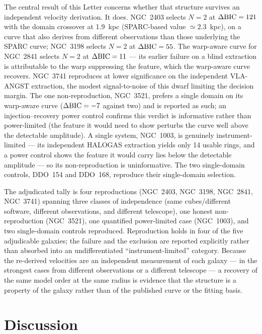 \documentclass[twocolumn]{aastex701}
\newcommand{\dbic}{\Delta{\rm BIC}}
\begin{document}
The central result of this Letter concerns whether that structure survives an
independent velocity derivation. It does. NGC~2403 selects $N = 2$ at $\dbic =
121$ with the domain crossover at 1.9~kpc (SPARC-based value $\simeq 2.3$~kpc),
on a curve that also derives from different observations than those underlying the
SPARC curve; NGC~3198 selects $N = 2$ at $\dbic = 55$. The warp-aware curve for
NGC~2841 selects $N = 2$ at $\dbic = 11$ --- its earlier failure on a blind
extraction is attributable to the warp suppressing the feature, which the
warp-aware curve recovers. NGC~3741 reproduces at lower significance on the
independent VLA-ANGST extraction, the modest signal-to-noise of this dwarf
limiting the decision margin. The one non-reproduction, NGC~3521, prefers a
single domain on its warp-aware curve ($\dbic = -7$ against two) and is reported
as such; an injection--recovery power control confirms this verdict is
informative rather than power-limited (the feature it would need to show perturbs
the curve well above the detectable amplitude). A single system, NGC~1003, is
genuinely instrument-limited --- its independent HALOGAS extraction yields only 14
usable rings, and a power control shows the feature it would carry lies below the
detectable amplitude --- so its non-reproduction is uninformative. The two
single-domain controls, DDO~154 and DDO~168, reproduce their single-domain
selection.

The adjudicated tally is four reproductions (NGC~2403, NGC~3198, NGC~2841,
NGC~3741) spanning three classes of independence (same cubes/different software,
different observations, and different telescope), one honest non-reproduction
(NGC~3521), one quantified power-limited case (NGC~1003), and two single-domain
controls reproduced. Reproduction holds in four of the five adjudicable galaxies;
the failure and the exclusion are reported explicitly rather than absorbed into an
undifferentiated ``instrument-limited'' category. Because the re-derived
velocities are an independent measurement of each galaxy --- in the strongest
cases from different observations or a different telescope --- a recovery of the
same model order at the same radius is evidence that the structure is a property
of the galaxy rather than of the published curve or the fitting basis.

\section{Discussion} \label{sec:discussion}
\end{document}
